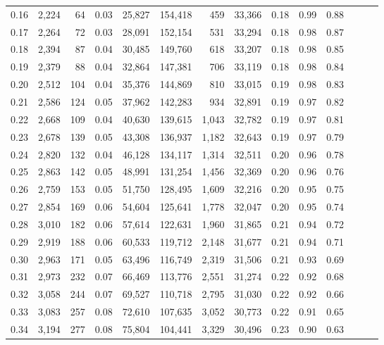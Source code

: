\begin{tabular}{rrrrrrrrrrrrrr}
0.16 &  2,224 &   64 &  0.03 &   25,827 &  154,418 &     459 &  33,366 &  0.18 &  0.99 &      0.88 \\
0.17 &  2,264 &   72 &  0.03 &   28,091 &  152,154 &     531 &  33,294 &  0.18 &  0.98 &      0.87 \\
0.18 &  2,394 &   87 &  0.04 &   30,485 &  149,760 &     618 &  33,207 &  0.18 &  0.98 &      0.85 \\
0.19 &  2,379 &   88 &  0.04 &   32,864 &  147,381 &     706 &  33,119 &  0.18 &  0.98 &      0.84 \\
0.20 &  2,512 &  104 &  0.04 &   35,376 &  144,869 &     810 &  33,015 &  0.19 &  0.98 &      0.83 \\
0.21 &  2,586 &  124 &  0.05 &   37,962 &  142,283 &     934 &  32,891 &  0.19 &  0.97 &      0.82 \\
0.22 &  2,668 &  109 &  0.04 &   40,630 &  139,615 &   1,043 &  32,782 &  0.19 &  0.97 &      0.81 \\
0.23 &  2,678 &  139 &  0.05 &   43,308 &  136,937 &   1,182 &  32,643 &  0.19 &  0.97 &      0.79 \\
0.24 &  2,820 &  132 &  0.04 &   46,128 &  134,117 &   1,314 &  32,511 &  0.20 &  0.96 &      0.78 \\
0.25 &  2,863 &  142 &  0.05 &   48,991 &  131,254 &   1,456 &  32,369 &  0.20 &  0.96 &      0.76 \\
0.26 &  2,759 &  153 &  0.05 &   51,750 &  128,495 &   1,609 &  32,216 &  0.20 &  0.95 &      0.75 \\
0.27 &  2,854 &  169 &  0.06 &   54,604 &  125,641 &   1,778 &  32,047 &  0.20 &  0.95 &      0.74 \\
0.28 &  3,010 &  182 &  0.06 &   57,614 &  122,631 &   1,960 &  31,865 &  0.21 &  0.94 &      0.72 \\
0.29 &  2,919 &  188 &  0.06 &   60,533 &  119,712 &   2,148 &  31,677 &  0.21 &  0.94 &      0.71 \\
0.30 &  2,963 &  171 &  0.05 &   63,496 &  116,749 &   2,319 &  31,506 &  0.21 &  0.93 &      0.69 \\
0.31 &  2,973 &  232 &  0.07 &   66,469 &  113,776 &   2,551 &  31,274 &  0.22 &  0.92 &      0.68 \\
0.32 &  3,058 &  244 &  0.07 &   69,527 &  110,718 &   2,795 &  31,030 &  0.22 &  0.92 &      0.66 \\
0.33 &  3,083 &  257 &  0.08 &   72,610 &  107,635 &   3,052 &  30,773 &  0.22 &  0.91 &      0.65 \\
0.34 &  3,194 &  277 &  0.08 &   75,804 &  104,441 &   3,329 &  30,496 &  0.23 &  0.90 &      0.63 \\

\end{tabular}
